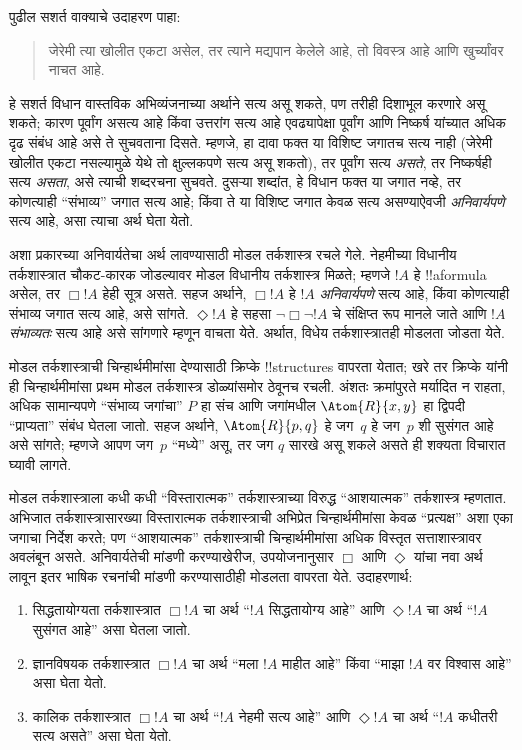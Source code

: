 \documentclass[../../../include/open-logic-section]{subfiles}
\begin{document}


पुढील सशर्त वाक्याचे उदाहरण पाहा:
\begin{quote}
  जेरेमी त्या खोलीत एकटा असेल, तर त्याने मद्यपान केलेले आहे, तो विवस्त्र आहे
  आणि खुर्च्यांवर नाचत आहे.
\end{quote}
हे सशर्त विधान वास्तविक अभिव्यंजनाच्या अर्थाने सत्य असू शकते, पण तरीही
दिशाभूल करणारे असू शकते; कारण पूर्वांग असत्य आहे किंवा उत्तरांग सत्य आहे
एवढ्यापेक्षा पूर्वांग
आणि निष्कर्ष यांच्यात अधिक दृढ संबंध आहे असे ते सुचवताना दिसते. म्हणजे, हा
दावा फक्त या विशिष्ट जगातच सत्य नाही (जेरेमी खोलीत एकटा नसल्यामुळे येथे तो
क्षुल्लकपणे सत्य असू शकतो), तर पूर्वांग सत्य \emph{असते}, तर निष्कर्षही सत्य
\emph{असता}, असे त्याची शब्दरचना सुचवते. दुसऱ्या शब्दांत, हे विधान फक्त या
जगात नव्हे, तर कोणत्याही “संभाव्य” जगात सत्य आहे; किंवा ते या विशिष्ट जगात
केवळ सत्य असण्याऐवजी \emph{अनिवार्यपणे} सत्य आहे, असा त्याचा अर्थ घेता येतो.

अशा प्रकारच्या अनिवार्यतेचा अर्थ लावण्यासाठी मोडल तर्कशास्त्र रचले गेले.
नेहमीच्या विधानीय तर्कशास्त्रात चौकट-कारक जोडल्यावर मोडल विधानीय
तर्कशास्त्र मिळते; म्हणजे $!A$ हे !!a{formula} असेल, तर $\Box !A$ हेही
सूत्र असते. सहज अर्थाने, $\Box !A$ हे $!A$ \emph{अनिवार्यपणे} सत्य
आहे, किंवा कोणत्याही संभाव्य जगात सत्य आहे, असे सांगते. $\Diamond !A$ हे
सहसा $\lnot \Box \lnot !A$ चे संक्षिप्त रूप मानले जाते आणि $!A$
\emph{संभाव्यतः} सत्य आहे असे सांगणारे म्हणून वाचता येते. अर्थात, विधेय
तर्कशास्त्रातही मोडलता जोडता येते.

मोडल तर्कशास्त्राची चिन्हार्थमीमांसा देण्यासाठी क्रिप्के !!{structure}s वापरता
येतात; खरे तर क्रिप्के यांनी ही चिन्हार्थमीमांसा प्रथम मोडल तर्कशास्त्र
डोळ्यांसमोर ठेवूनच रचली. अंशतः क्रमांपुरते मर्यादित न राहता, अधिक सामान्यपणे
“संभाव्य जगांचा” $P$ हा संच आणि जगांमधील $\Atom{R}{x,y}$ हा द्विपदी
“प्राप्यता” संबंध घेतला जातो. सहज अर्थाने, $\Atom{R}{p,q}$ हे जग~$q$ हे
जग~$p$ शी सुसंगत आहे असे सांगते; म्हणजे आपण जग~$p$ “मध्ये” असू, तर जग
$q$ सारखे असू शकले असते ही शक्यता विचारात घ्यावी लागते.

मोडल तर्कशास्त्राला कधी कधी “विस्तारात्मक” तर्कशास्त्राच्या विरुद्ध
“आशयात्मक” तर्कशास्त्र म्हणतात. अभिजात तर्कशास्त्रासारख्या विस्तारात्मक
तर्कशास्त्राची अभिप्रेत चिन्हार्थमीमांसा केवळ “प्रत्यक्ष” अशा एका जगाचा
निर्देश करते; पण “आशयात्मक” तर्कशास्त्राची चिन्हार्थमीमांसा अधिक विस्तृत
सत्ताशास्त्रावर अवलंबून असते. अनिवार्यतेची मांडणी करण्याखेरीज,
उपयोजनानुसार $\Box$ आणि $\Diamond$ यांचा नवा अर्थ लावून इतर भाषिक रचनांची
मांडणी करण्यासाठीही मोडलता वापरता येते. उदाहरणार्थ:
\begin{enumerate}
\item सिद्धतायोग्यता तर्कशास्त्रात $\Box !A$ चा अर्थ “$!A$ सिद्धतायोग्य
  आहे” आणि $\Diamond !A$ चा अर्थ “$!A$ सुसंगत आहे” असा घेतला जातो.
\item ज्ञानविषयक तर्कशास्त्रात $\Box !A$ चा अर्थ “मला $!A$ माहीत आहे” किंवा
  “माझा $!A$ वर विश्वास आहे” असा घेता येतो.
\item कालिक तर्कशास्त्रात $\Box !A$ चा अर्थ “$!A$ नेहमी सत्य आहे” आणि
  $\Diamond !A$ चा अर्थ “$!A$ कधीतरी सत्य असते” असा घेता येतो.
\end{enumerate}
\end{document}
